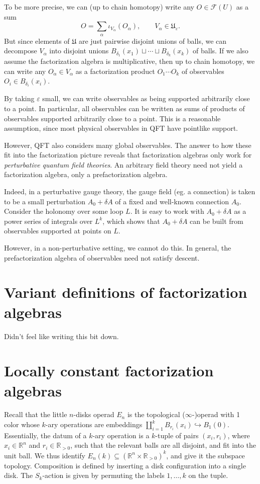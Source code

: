 To be more precise, we can (up to chain homotopy) write any $O\in \mathcal{F} (U)$ as a sum
\[
	O= \sum_{\alpha } \iota_{V_\alpha } (O_\alpha ),\qquad V_\alpha \in \mathfrak{U}_{\varepsilon } 
.\]
But since elements of $\mathfrak{U} $ are just pairwise disjoint unions of balls, we can decompose $V_\alpha $ into disjoint unions $B_{\delta _1} (x_1) \sqcup \cdots \sqcup B_{\delta _k} (x_k)$ of balls. If we also assume the factorization algebra is multiplicative, then up to chain homotopy, we can write any $O_\alpha \in V_\alpha $ as a factorization product $O_1 \cdots O_k$ of observables $O_i\in B_{\delta _i} (x_i)$.

By taking $\varepsilon $ small, we can write observables as being supported arbitrarily close to a point. In particular, all observables can be written as sums of products of observables supported arbitrarily close to a point. This is a reasonable assumption, since most physical observables in QFT have pointlike support.

However, QFT also considers many global observables. The answer to how these fit into the factorization picture reveals that factorization algebras only work for \emph{perturbative quantum field theories}. An arbitrary field theory need not yield a factorization algebra, only a prefactorization algebra.

Indeed, in a perturbative gauge theory, the gauge field (eg. a connection) is taken to be a small perturbation $A_0 + \delta A$ of a fixed and well-known connection $A_0$. Consider the holonomy over some loop $L$. It is easy to work with $A_0 + \delta A$ as a power series of integrals over $L^k$, which shows that $A_0 + \delta A$ can be built from observables supported at points on $L$.

However, in a non-perturbative setting, we cannot do this. In general, the prefactorization algebra of observables need not satisfy descent.


\section{Variant definitions of factorization algebras}

Didn't feel like writing this bit down.

\section{Locally constant factorization algebras}


Recall that the little $n$-disks operad $E_n$ is the topological ($\infty $-)operad with 1 color whose $k$-ary operations are embeddings $\coprod_{i=1}^k B_{r_i} (x_i)\hookrightarrow B_1(0)$. Essentially, the datum of a $k$-ary operation is a $k$-tuple of pairs $(x_i,r_i)$, where $x_i\in\mathbb{R} ^n$ and $r_i\in\mathbb{R} _{>0} $, such that the relevant balls are all disjoint, and fit into the unit ball. We thus identify $E_n(k) \subseteq \left( \mathbb{R} ^n\times \mathbb{R} _{>0}  \right) ^k$, and give it the subspace topology. Composition is defined by inserting a disk configuration into a single disk. The $S_k$-action is given by permuting the labels $1, \ldots , k$ on the tuple.

